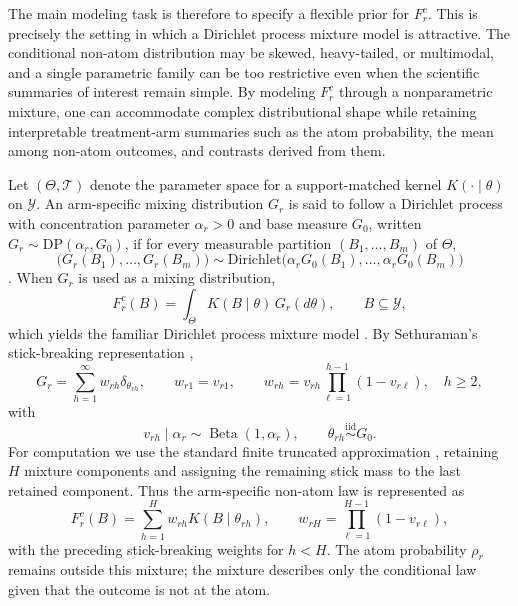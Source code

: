 \documentclass[11pt]{article}
\DeclareMathOperator*{\Beta}{Beta}
\begin{document}
The main modeling task is therefore to specify a flexible prior for $F_r^c$. This is precisely the setting in which a Dirichlet process mixture model is attractive. The conditional non-atom distribution may be skewed, heavy-tailed, or multimodal, and a single parametric family can be too restrictive even when the scientific summaries of interest remain simple. By modeling $F_r^c$ through a nonparametric mixture, one can accommodate complex distributional shape while retaining interpretable treatment-arm summaries such as the atom probability, the mean among non-atom outcomes, and contrasts derived from them.

Let $(\Theta,\mathcal{T})$ denote the parameter space for a support-matched kernel $K(\cdot \mid \theta)$ on $\mathcal{Y}$. An arm-specific mixing distribution $G_r$ is said to follow a Dirichlet process with concentration parameter $\alpha_r > 0$ and base measure $G_0$, written $G_r \sim \mathrm{DP}(\alpha_r,G_0)$, if for every measurable partition $(B_1,\ldots,B_m)$ of $\Theta$,
\[
  \bigl(G_r(B_1),\ldots,G_r(B_m)\bigr)
  \sim
  \mathrm{Dirichlet}\bigl(\alpha_r G_0(B_1),\ldots,\alpha_r G_0(B_m)\bigr)
\]
\citep{ferguson1973bayesian}. When $G_r$ is used as a mixing distribution,
\[
  F_r^c(B) = \int_{\Theta} K(B \mid \theta)\,G_r(d\theta),
  \qquad B \subseteq \mathcal{Y},
\]
which yields the familiar Dirichlet process mixture model \citep{antoniak1974mixtures}. By Sethuraman's stick-breaking representation \citep{sethuraman1994constructive},
\[
  G_r = \sum_{h=1}^{\infty} w_{rh}\delta_{\theta_{rh}},
  \qquad
  w_{r1} = v_{r1},
  \qquad
  w_{rh} = v_{rh}\prod_{\ell=1}^{h-1}(1-v_{r\ell}),
  \quad h \geq 2,
\]
with
\[
  v_{rh} \mid \alpha_r \sim \Beta(1,\alpha_r),
  \qquad
  \theta_{rh} \stackrel{\mathrm{iid}}{\sim} G_0.
\]
For computation we use the standard finite truncated approximation \citep{ishwaran2001gibbs}, retaining $H$ mixture components and assigning the remaining stick mass to the last retained component. Thus the arm-specific non-atom law is represented as
\[
  F_r^c(B)
  =
  \sum_{h=1}^{H}w_{rh}K(B\mid\theta_{rh}),
  \qquad
  w_{rH}=\prod_{\ell=1}^{H-1}(1-v_{r\ell}),
\]
with the preceding stick-breaking weights for $h<H$. The atom probability $\rho_r$ remains outside this mixture; the mixture describes only the conditional law given that the outcome is not at the atom.
\end{document}
